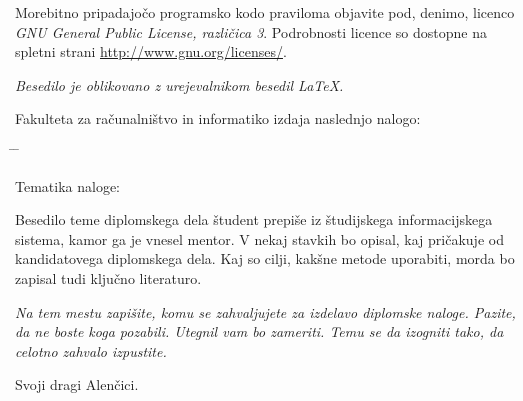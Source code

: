 \documentclass[a4paper, 12pt]{book}
\newcommand{\clearemptydoublepage}{\newpage{\pagestyle{empty}\cleardoublepage}}
\begin{document}
Morebitno pripadajočo programsko kodo praviloma objavite pod, denimo, licenco 
\emph{GNU General Public License, različica 3}. Podrobnosti licence so dostopne na spletni strani \href{http://www.gnu.org/licenses/}{http://www.gnu.org/licenses/}.

\begin{center}
\mbox{}\vfill
\emph{Besedilo je oblikovano z urejevalnikom besedil \LaTeX.}
\end{center}
\clearemptydoublepage

\thispagestyle{empty}
\vspace*{4cm}

\noindent
Fakulteta za računalništvo in informatiko izdaja naslednjo nalogo:
\medskip
\begin{tabbing}
\hspace{32mm}\= \hspace{6cm} \= \kill




Tematika naloge:
\end{tabbing}
Besedilo teme diplomskega dela študent prepiše iz študijskega informacijskega sistema, kamor ga je vnesel mentor. V nekaj stavkih bo opisal, kaj pričakuje od kandidatovega diplomskega dela. Kaj so cilji, kakšne metode uporabiti, morda bo zapisal tudi ključno literaturo.
\vspace{15mm}






\vspace{2cm}

\clearemptydoublepage

\thispagestyle{empty}\mbox{}\vfill\null\it%
Na tem mestu zapišite, komu se zahvaljujete za izdelavo diplomske naloge. Pazite, da ne boste koga pozabili. Utegnil vam bo zameriti. Temu se da izogniti tako, da celotno zahvalo izpustite.
\rm\normalfont

\clearemptydoublepage

\thispagestyle{empty}\mbox{}{\textheight}\mbox{}\hfill\begin{minipage}{0.55\textwidth}%
Svoji dragi Alenčici.
\normalfont\end{minipage}

\clearemptydoublepage


\pagestyle{empty}
\def\thepage{}%
\tableofcontents{}
\end{document}
